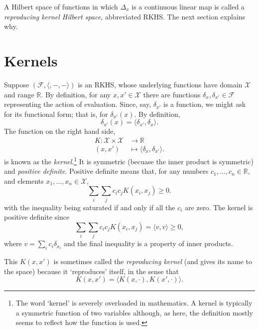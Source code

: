 \documentclass[11pt]{article}
\begin{document}
A Hilbert space of functions in which \(\Delta_x\) is a continuous linear map is
called a \emph{reproducing kernel Hilbert space}, abbreviated RKHS. The next section
explains why.

\section{Kernels}
\label{sec:org55e7ec8}

Suppose \((\mathcal{F}, \langle, -, -\rangle)\) is an RKHS, whose underlying
functions have domain \(\mathcal{X}\) and range \(\mathbb{R}\). By definition, for any \(x,
x'\in\mathcal{X}\) there are functions \(\delta_{x}, \delta_{x'}\in\mathcal{F}\)
representing the action of evaluation. Since, say, \(\delta_{x'}\) is a function,
we might ask for its functional form; that is, for \(\delta_{x'}(x)\). By
definition,
\begin{equation*}
\delta_{x'}(x) = \langle \delta_{x'}, \delta_{x}\rangle.
\end{equation*}
The function on the right hand side, 
\begin{equation*}
\begin{aligned}
K : \mathcal{X}\times\mathcal{X} & \to \mathbb{R} \\
     (x, x')                     & \mapsto \langle \delta_x, \delta_{x'}\rangle. 
\end{aligned}
\end{equation*}
is known as the \emph{kernel}.\footnote{The word `kernel' is severely overloaded in mathematics. A kernel is
typically a symmetric function of two variables although, as here, the
definition mostly seems to reflect how the function is used.} It is symmetric (becuase the inner product is
symmetric) and \emph{positive definite}. Positive definite means that, for any
numbers \(c_1, \dotsc, c_n\in\mathbb{R}\), and elements \(x_1, \dotsc, x_n\in
\mathcal{X}\),
\begin{equation*}
\sum_i \sum_j c_i c_j K(x_i, x_j) \geq 0.
\end{equation*}
with the inequality being saturated if and only if all the \(c_i\) are zero. The
kernel is positive definite since
\begin{equation*}
\sum_i \sum_j c_i c_j K(x_i, x_j) = \langle v, v\rangle \geq 0,
\end{equation*}
where \(v = \sum_i c_i\delta_{x_i}\) and the final inequality is a property of
inner products.

This \(K(x, x')\) is sometimes called the \emph{reproducing kernel} (and gives its name
to the space) because it `reproduces' itself, in the sense that
\begin{equation*}
K(x, x') = \langle K(x, \cdot), K(x', \cdot)\rangle .
\end{equation*}
\end{document}
